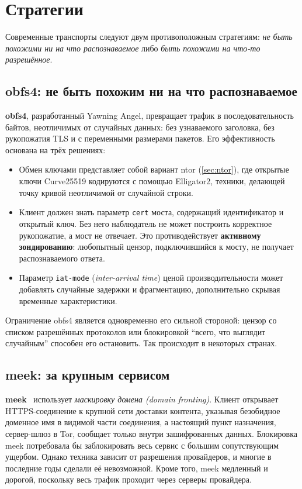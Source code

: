 \section{Стратегии}\label{sec:cens-strategie}

Современные транспорты следуют двум противоположным стратегиям: \emph{не быть похожими ни на что распознаваемое} либо \emph{быть похожими на что-то разрешённое}.

\subsection{obfs4: не быть похожим ни на что распознаваемое}

\textbf{obfs4}, разработанный Yawning Angel, превращает трафик в последовательность байтов, неотличимых от случайных данных: без узнаваемого заголовка, без рукопожатия TLS и с переменными размерами пакетов. Его эффективность основана на трёх решениях:
\begin{itemize}
  \item Обмен ключами представляет собой вариант ntor (\cref{sec:ntor}), где открытые ключи Curve25519 кодируются с помощью Elligator2, техники, делающей точку кривой неотличимой от случайной строки.
  \item Клиент должен знать параметр \texttt{cert} моста, содержащий идентификатор и открытый ключ. Без него наблюдатель не может построить корректное рукопожатие, а мост не отвечает. Это противодействует \textbf{активному зондированию}: любопытный цензор, подключившийся к мосту, не получает распознаваемого ответа.
  \item Параметр \texttt{iat-mode} (\emph{inter-arrival time}) ценой производительности может добавлять случайные задержки и фрагментацию, дополнительно скрывая временные характеристики.
\end{itemize}
Ограничение obfs4 является одновременно его сильной стороной: цензор со списком разрешённых протоколов или блокировкой \enquote{всего, что выглядит случайным} способен его остановить. Так происходит в некоторых странах.

\subsection{meek: за крупным сервисом}

\textbf{meek}~\cite{fifield2015fronting} использует \emph{маскировку домена (domain fronting)}. Клиент открывает HTTPS-соединение к крупной сети доставки контента, указывая безобидное доменное имя в видимой части соединения, а настоящий пункт назначения, сервер-шлюз в Tor, сообщает только внутри зашифрованных данных. Блокировка meek потребовала бы заблокировать весь сервис с большим сопутствующим ущербом. Однако техника зависит от разрешения провайдеров, и многие в последние годы сделали её невозможной. Кроме того, meek медленный и дорогой, поскольку весь трафик проходит через серверы провайдера.

